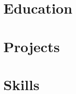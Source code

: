 \documentclass{resume}
\begin{document}
\SharedHeader

\section{Education}
\SharedEducation

\section{Projects}
\SharedToolProject
\begin{jobduties}
  \ToolWorkflow
  \ToolRecovery
  \ToolStorage
\end{jobduties}

\SharedCourseProject
\begin{jobduties}
  \CourseContribution
  \CourseQueries
  \CourseChecks
\end{jobduties}


\section{Skills}
\SharedSkills
\end{document}
